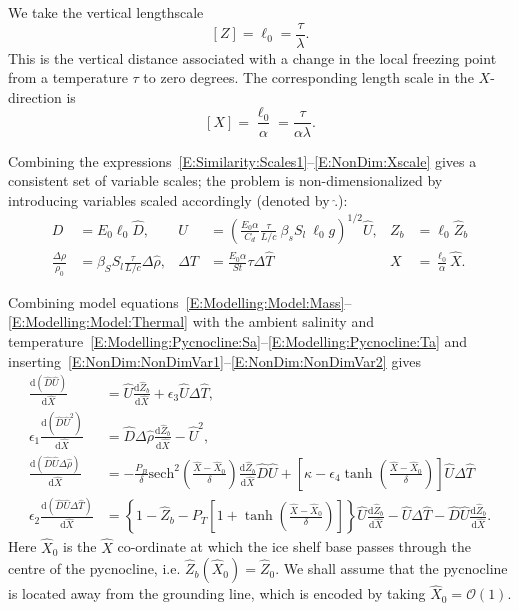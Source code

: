 \documentclass[openacc]{rsproca_new}%
\newcommand{\dd}[2]{\frac{\mathrm{d} #1}{\mathrm{d} #2}}
\newcommand{\order}[1]{\mathcal{O}(#1)}
\newcommand{\epsone}{\epsilon_{1}} %
\newcommand{\epstwo}{\epsilon_{2}} %
\newcommand{\epsthree}{\epsilon_{3}} %
\newcommand{\epsfour}{\epsilon_{4}}
\newcommand{\Pb}{\textit{P}_B}  %
\newcommand{\lt}{\delta} %
\newcommand{\Pt}{\textit{P}_T}
\begin{document}
We take the vertical lengthscale
\begin{equation}
\left[Z\right] = \ell_0=\frac{ \tau }{\lambda}.
\end{equation}
This is the vertical distance associated with a change in the local freezing point from a temperature $\tau$ to zero degrees. The corresponding length scale in the $X$-direction is
\begin{equation}\label{E:NonDim:Xscale}
\left[X\right] =\frac{ \ell_0}{\alpha}=\frac{ \tau }{\alpha \lambda}.
\end{equation}

Combining the expressions~\eqref{E:Similarity:Scales1}--\eqref{E:NonDim:Xscale} gives a consistent set of variable scales; the problem is non-dimensionalized by introducing variables scaled accordingly (denoted by  $\hat{.}$):
\begin{align}
D&= E_0 \ell_0 \hat{D}, & U&= \left(\frac{E_0 \alpha}{C_d} \frac{\tau}{L/c}~\beta_s S_l ~\ell_0  g\right)^{1/2}\hat{U}, & Z_b &= \ell_0 \hat{Z}_b\label{E:NonDim:NonDimVar1}\\
\frac{\Delta \rho}{\rho_0} &= \beta_S S_l \frac{\tau}{L/c}\Delta \hat{\rho}, & \Delta T &= \frac{E_0 \alpha}{St}\tau \Delta \hat{T} & X &=\frac{\ell_0}{\alpha}\hat{X}. \label{E:NonDim:NonDimVar2}
\end{align}

Combining model equations~\eqref{E:Modelling:Model:Mass}--\eqref{E:Modelling:Model:Thermal} with the ambient salinity and temperature~\eqref{E:Modelling:Pycnocline:Sa}--\eqref{E:Modelling:Pycnocline:Ta} and inserting~\eqref{E:NonDim:NonDimVar1}--\eqref{E:NonDim:NonDimVar2} gives
\begin{align}
\dd{(\hat{D}\hat{U})}{\hat{X}} &= \hat{U} \dd{\hat{Z}_b}{\hat{X}} +\epsthree \hat{U} \Delta \hat{T},\label{E:NonDim:mass}\\
\epsone \dd{(\hat{D}\hat{U}^2)}{\hat{X}} &= \hat{D} \Delta \hat{\rho} \dd{\hat{Z}_b}{\hat{X}} - \hat{U}^2,\label{E:NonDim:mom} \\
\dd{(\hat{D}\hat{U}\Delta \hat{\rho})}{\hat{X}}  &= -\frac{\Pb}{\delta} \mathrm{sech}^2\left(\frac{\hat{X} - \hat{X}_0}{\lt}\right)\dd{\hat{Z}_b}{\hat{X}} \hat{D}\hat{U}+
 \left[\kappa - \epsfour \tanh \left(\frac{\hat{X} - \hat{X}_0}{\lt}\right) \right] \hat{U} \Delta \hat{T}\label{E:NonDim:buoyancy} \\
\epstwo \dd{(\hat{D}\hat{U}\Delta \hat{T})}{\hat{X}} &= \left\{1 - \hat{Z}_b - \Pt\left[1 + \tanh\left(\frac{\hat{X} - \hat{X}_0}{\lt}\right)\right]\right\} \hat{U}\dd{\hat{Z}_b}{\hat{X}}  - \hat{U}\Delta \hat{T}- \hat{D}\hat{U}\dd{\hat{Z}_b}{\hat{X}}.\label{E:NonDim:thermal}
 \end{align}
Here $\hat{X}_0$ is the $\hat{X}$ co-ordinate at which the ice shelf base passes through the centre of the pycnocline, i.e. $\hat{Z}_b(\hat{X}_0) = \hat{Z}_0$. We shall assume  that the pycnocline is located away from the grounding line, which is encoded by taking $\hat{X}_0 = \order{1}$.
\end{document}
